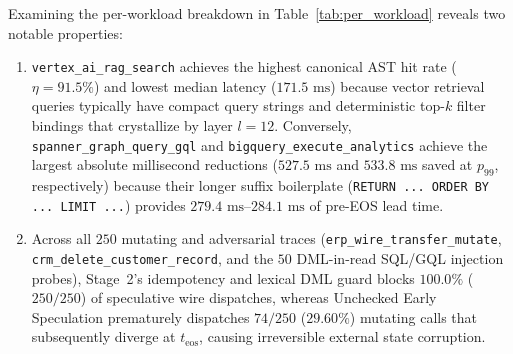 \documentclass[10pt,conference]{IEEEtran}
\begin{document}
Examining the per-workload breakdown in Table~\ref{tab:per_workload} reveals two notable properties:
\begin{enumerate}
    \item \texttt{vertex\_ai\_rag\_search} achieves the highest canonical AST hit rate ($\eta = 91.5\%$) and lowest median latency ($171.5\text{ ms}$) because vector retrieval queries typically have compact query strings and deterministic top-$k$ filter bindings that crystallize by layer $l = 12$. Conversely, \texttt{spanner\_graph\_query\_gql} and \texttt{bigquery\_execute\_analytics} achieve the largest absolute millisecond reductions ($527.5\text{ ms}$ and $533.8\text{ ms}$ saved at $p_{99}$, respectively) because their longer suffix boilerplate (\texttt{RETURN ... ORDER BY ... LIMIT ...}) provides $279.4\text{ ms}$--$284.1\text{ ms}$ of pre-EOS lead time.
    \item Across all $250$ mutating and adversarial traces (\texttt{erp\_wire\_transfer\_mutate}, \texttt{crm\_delete\_customer\_record}, and the $50$ DML-in-read SQL/GQL injection probes), Stage~2's idempotency and lexical DML guard blocks $100.0\%$ ($250/250$) of speculative wire dispatches, whereas Unchecked Early Speculation prematurely dispatches $74/250$ ($29.60\%$) mutating calls that subsequently diverge at $t_{\text{eos}}$, causing irreversible external state corruption.
\end{enumerate}
\end{document}
